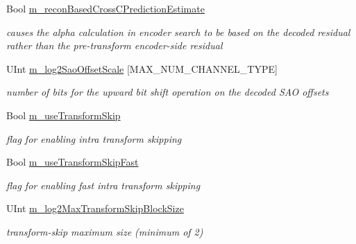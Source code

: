 \begin{DoxyCompactItemize}
\mbox{\label{class_t_app_enc_cfg_af77b09a2d57ccaeaffcda617de30d3a0}} 
Bool \hyperlink{class_t_app_enc_cfg_af77b09a2d57ccaeaffcda617de30d3a0}{m\+\_\+recon\+Based\+Cross\+C\+Prediction\+Estimate}
\begin{DoxyCompactList}\small\item\em causes the alpha calculation in encoder search to be based on the decoded residual rather than the pre-\/transform encoder-\/side residual \end{DoxyCompactList}\item 
\mbox{\label{class_t_app_enc_cfg_aa1b2c05c6cf8ed675a198d4aabb1a7eb}} 
U\+Int \hyperlink{class_t_app_enc_cfg_aa1b2c05c6cf8ed675a198d4aabb1a7eb}{m\+\_\+log2\+Sao\+Offset\+Scale} \mbox{[}M\+A\+X\+\_\+\+N\+U\+M\+\_\+\+C\+H\+A\+N\+N\+E\+L\+\_\+\+T\+Y\+PE\mbox{]}
\begin{DoxyCompactList}\small\item\em number of bits for the upward bit shift operation on the decoded S\+AO offsets \end{DoxyCompactList}\item 
\mbox{\label{class_t_app_enc_cfg_a3bd79a8d633dcab8dc44ba55657800e8}} 
Bool \hyperlink{class_t_app_enc_cfg_a3bd79a8d633dcab8dc44ba55657800e8}{m\+\_\+use\+Transform\+Skip}
\begin{DoxyCompactList}\small\item\em flag for enabling intra transform skipping \end{DoxyCompactList}\item 
\mbox{\label{class_t_app_enc_cfg_aaa13b9ea001008775a99b4cd5a22e690}} 
Bool \hyperlink{class_t_app_enc_cfg_aaa13b9ea001008775a99b4cd5a22e690}{m\+\_\+use\+Transform\+Skip\+Fast}
\begin{DoxyCompactList}\small\item\em flag for enabling fast intra transform skipping \end{DoxyCompactList}\item 
\mbox{\label{class_t_app_enc_cfg_a63d6d3c774b1c4ffbe8910a5f804f1d7}} 
U\+Int \hyperlink{class_t_app_enc_cfg_a63d6d3c774b1c4ffbe8910a5f804f1d7}{m\+\_\+log2\+Max\+Transform\+Skip\+Block\+Size}
\begin{DoxyCompactList}\small\item\em transform-\/skip maximum size (minimum of 2) \end{DoxyCompactList}\item 

\end{DoxyCompactItemize}
